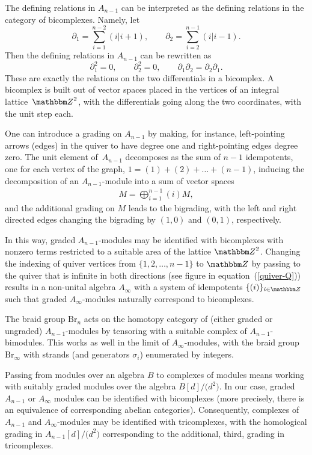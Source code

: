 \documentclass[pdftex]{sigma}
\theoremstyle{definition}
\numberwithin{equation}{section}
\def\Z{{\mathbbm Z}}
\begin{document}
The defining relations in $A_{n-1}$ can be interpreted as the defining relations in the category of bicomplexes. Namely, let
\[
\partial_1 = \sum_{i=1}^{n-2}(i|i+1), \qquad
\partial_2 = \sum_{i=2}^{n-1}(i|i-1).
\]
Then the defining relations in $A_{n-1}$ can be rewritten as
\[ \partial_1^2=0, \qquad \partial_2^2=0, \qquad \partial_1\partial_2 =
\partial_2\partial_1.
\]
These are exactly the relations on the two differentials in a bicomplex. A bicomplex is built out of vector spaces placed in the vertices of an integral lattice~$\Z^2$, with the differentials going along the two coordinates, with the unit step each.

One can introduce a grading on $A_{n-1}$ by making, for instance, left-pointing arrows (edges) in the quiver to have degree one and right-pointing edges degree zero. The unit element of~$A_{n-1}$ decomposes as the sum of $n-1$ idempotents, one for each vertex of the graph,
$1 = (1)+(2)+\dots + (n-1)$, inducing the decomposition of an $A_{n-1}$-module into a sum of vector spaces
\begin{gather*} M = \bigoplus_{i=1}^{n-1} (i) M ,\end{gather*}
and the additional grading on $M$ leads to the bigrading, with the left and right directed edges changing the bigrading by $(1,0)$ and $(0,1)$, respectively.

In this way, graded $A_{n-1}$-modules may be identified with bicomplexes with nonzero terms restricted to a suitable area of the lattice $\Z^2$. Changing the indexing of quiver vertices from $\{1,2,\dots, n-1\}$ to $\Z$ by passing
to the quiver that is infinite in both directions (see figure in equation~(\ref{quiver-Q}))
results in a non-unital algebra $A_{\infty}$ with a system of idempotents
$\{(i)\}_{i \in \Z}$ such that graded $A_{\infty}$-modules naturally correspond to bicomplexes.

The braid group $\mathrm{Br}_n$ acts on the homotopy category of (either graded or ungraded) $A_{n-1}$-modules by tensoring with a suitable complex of $A_{n-1}$-bimodules. This works as well in the limit of $A_{\infty}$-modules, with the braid group $\mathrm{Br}_\infty$ with strands (and generators $\sigma_i$) enumerated by integers.

Passing from modules over an algebra $B$ to complexes of modules means working with suitably graded modules over the algebra $B[d]/\big(d^2\big)$. In our case, graded $A_{n-1}$ or $A_{\infty}$ modules can be identified with bicomplexes (more precisely, there is an equivalence of corresponding abelian categories). Consequently, complexes of
$A_{n-1}$ and $A_{\infty}$-modules may be identified with tricomplexes, with the homological
grading in $A_{n-1}[d]/\big(d^2\big)$ corresponding to the additional,
third, grading in tricomplexes.
\end{document}
